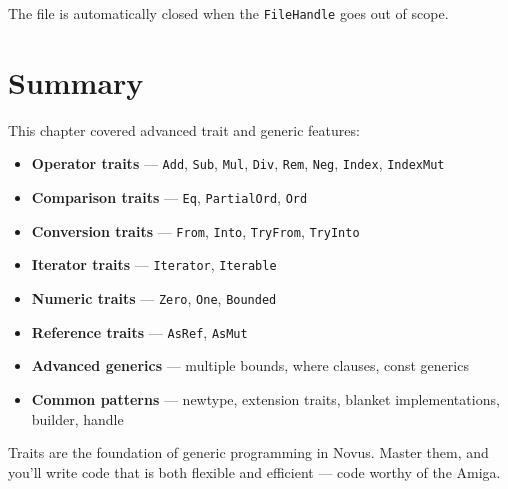 The file is automatically closed when the \texttt{FileHandle} goes out of scope.


\section{Summary}

This chapter covered advanced trait and generic features:

\begin{itemize}
    \item \textbf{Operator traits} --- \texttt{Add}, \texttt{Sub}, \texttt{Mul}, \texttt{Div}, \texttt{Rem}, \texttt{Neg}, \texttt{Index}, \texttt{IndexMut}
    \item \textbf{Comparison traits} --- \texttt{Eq}, \texttt{PartialOrd}, \texttt{Ord}
    \item \textbf{Conversion traits} --- \texttt{From}, \texttt{Into}, \texttt{TryFrom}, \texttt{TryInto}
    \item \textbf{Iterator traits} --- \texttt{Iterator}, \texttt{Iterable}
    \item \textbf{Numeric traits} --- \texttt{Zero}, \texttt{One}, \texttt{Bounded}
    \item \textbf{Reference traits} --- \texttt{AsRef}, \texttt{AsMut}
    \item \textbf{Advanced generics} --- multiple bounds, where clauses, const generics
    \item \textbf{Common patterns} --- newtype, extension traits, blanket implementations, builder, handle
\end{itemize}

Traits are the foundation of generic programming in Novus. Master them, and you'll write code that is both flexible and efficient --- code worthy of the Amiga.
